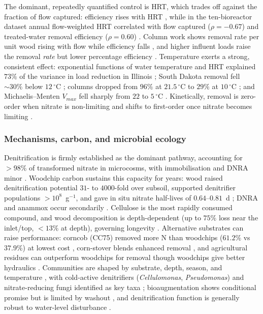 The dominant, repeatedly quantified control is HRT, which trades off against
the fraction of flow captured: efficiency rises with HRT
\parencite{Bell2015,Rivas2020}, while in the ten-bioreactor dataset annual
flow-weighted HRT correlated with flow captured ($\rho=-0.67$) and
treated-water removal efficiency ($\rho=0.60$)
\parencite{Christianson2026}. Column work shows removal rate per unit wood
rising with flow while efficiency falls \parencite{Greenan2009}, and higher
influent loads raise the removal \emph{rate} but lower percentage efficiency
\parencite{Rivas2020,Christianson2026,Zhang2021b}. Temperature exerts a
strong, consistent effect: exponential functions of water temperature and HRT
explained $73\%$ of the variance in load reduction in Illinois
\parencite{Bell2015}; South Dakota removal fell $\sim30\%$ below
$12\,^{\circ}$C \parencite{Thapa2023}; columns dropped from $96\%$ at
$21.5\,^{\circ}$C to $29\%$ at $10\,^{\circ}$C \parencite{Soupir2018}; and
Michaelis--Menten $V_{max}$ fell sharply from $22$ to $5\,^{\circ}$C
\parencite{Kouanda2021,Zhang2021b}. Kinetically, removal is zero-order when
nitrate is non-limiting and shifts to first-order once nitrate becomes
limiting \parencite{Hua2016,Kouanda2021}.

\subsubsection{Mechanisms, carbon, and microbial ecology}

Denitrification is firmly established as the dominant pathway, accounting for
$>98\%$ of transformed nitrate in microcosms, with immobilisation and DNRA
minor \parencite{Greenan2006,Greenan2009}. Woodchip carbon sustains this
capacity for years: wood raised denitrification potential $31$- to
$4000$-fold over subsoil, supported denitrifier populations $>10^8$~g$^{-1}$,
and gave in situ nitrate half-lives of $0.64$--$0.81$~d
\parencite{Moorman2010}; DNRA and anammox occur secondarily
\parencite{Hartfiel2022,Mendes2021}. Cellulose is the most rapidly consumed
compound, and wood decomposition is depth-dependent (up to $75\%$ loss near
the inlet/top, $<13\%$ at depth), governing longevity
\parencite{Hartfiel2022,Moorman2010,Ghane2018}. Alternative substrates can
raise performance: corncob (CC75) removed more N than woodchips ($61.2\%$ vs
$37.9\%$) at lowest cost \parencite{Law2023}, corn-stover blends enhanced
removal \parencite{Oladeji2023}, and agricultural residues can outperform
woodchips for removal though woodchips give better hydraulics
\parencite{Greenan2006,Kohn2023,Zhang2021b}. Communities are shaped by
substrate, depth, season, and temperature \parencite{Hartfiel2022}, with
cold-active denitrifiers (\textit{Cellulomonas}, \textit{Pseudomonas}) and
nitrate-reducing fungi identified as key taxa
\parencite{Anderson2020,Jang2019,Aldossari2021}; bioaugmentation shows
conditional promise but is limited by washout
\parencite{Jeglot2022,Wang2025b}, and denitrification function is generally
robust to water-level disturbance \parencite{Hathaway2017}.

